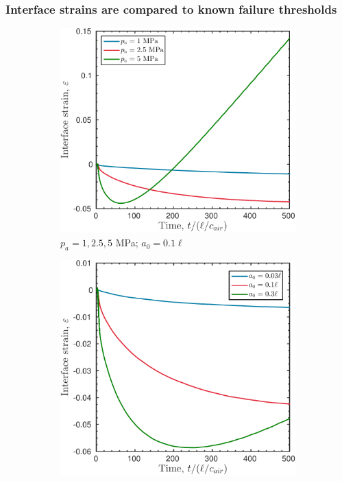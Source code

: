 \begin{frame}
  \frametitle{Interface strains are compared to known failure thresholds}
  \vspace*{0.5cm}
  \begin{figure}
    \centering
    \begin{subfigure}[b]{0.48\textwidth}
      \includegraphics[width=\textwidth]{../figs/lung_figs/rmawave_1_A10,25,50_a10_strain_08-Mar-2017}
      \caption{\label{fig:strain_multi-pa_a10} $p_a = 1, 2.5, 5$ MPa; $a_0 = 0.1\ell$}
    \end{subfigure}
    \begin{subfigure}[b]{0.5\textwidth}
      \includegraphics[width=\textwidth]{../figs/lung_figs/rmawave_1_A25_a03,10,30_strain_08-Mar-2017}

\end{subfigure}
\end{figure}
\end{frame}
